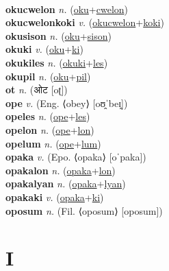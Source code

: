  \label{okumihutatuniluhilasomales} \\
\textbf{okucwelon} \textit{n.} (\hyperref[oku]{oku}+\hyperref[cwelon]{cwelon})
 \label{okucwelon} \\
\textbf{okucwelonkoki} \textit{v.} (\hyperref[okucwelon]{okucwelon}+\hyperref[koki]{koki})
 \label{okucwelonkoki} \\
\textbf{okusison} \textit{n.} (\hyperref[oku]{oku}+\hyperref[sison]{sison})
 \label{okusison} \\
\textbf{okuki} \textit{v.} (\hyperref[oku]{oku}+\hyperref[ki]{ki})
 \label{okuki} \\
\textbf{okukiles} \textit{n.} (\hyperref[okuki]{okuki}+\hyperref[les]{les})
 \label{okukiles} \\
\textbf{okupil} \textit{n.} (\hyperref[oku]{oku}+\hyperref[pil]{pil})
 \label{okupil} \\
\textbf{ot} \textit{n.} ({\devanagari{}ओट} [oʈ])
 \label{ot} \\
\textbf{ope} \textit{v.} (Eng. ⟨obey⟩ [oʊ̯ˈbeɪ̯])
 \label{ope} \\
\textbf{opeles} \textit{n.} (\hyperref[ope]{ope}+\hyperref[les]{les})
 \label{opeles} \\
\textbf{opelon} \textit{n.} (\hyperref[ope]{ope}+\hyperref[lon]{lon})
 \label{opelon} \\
\textbf{opelum} \textit{n.} (\hyperref[ope]{ope}+\hyperref[lum]{lum})
 \label{opelum} \\
\textbf{opaka} \textit{v.} (Epo. ⟨opaka⟩ [oˈpaka])
 \label{opaka} \\
\textbf{opakalon} \textit{n.} (\hyperref[opaka]{opaka}+\hyperref[lon]{lon})
 \label{opakalon} \\
\textbf{opakalyan} \textit{n.} (\hyperref[opaka]{opaka}+\hyperref[lyan]{lyan})
 \label{opakalyan} \\
\textbf{opakaki} \textit{v.} (\hyperref[opaka]{opaka}+\hyperref[ki]{ki})
 \label{opakaki} \\
\textbf{oposum} \textit{n.} (Fil. ⟨oposum⟩ [oposum])
 \label{oposum} 

\section{I}

